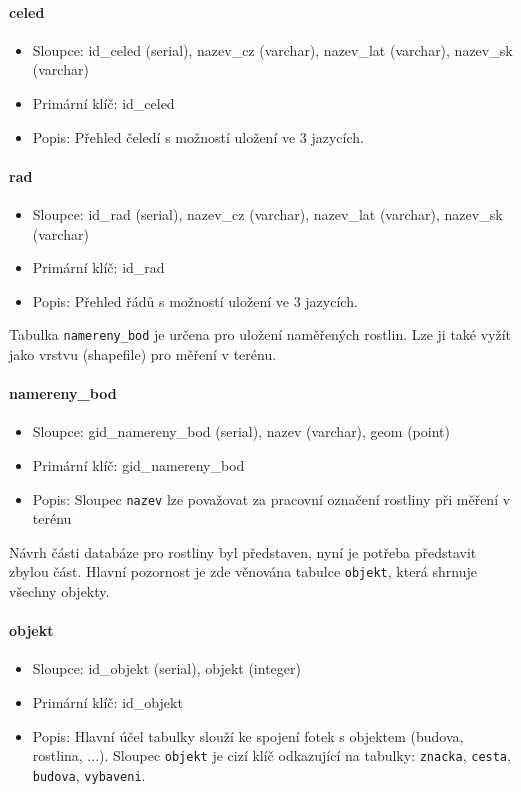 \documentclass[12pt]{article}%
\begin{document}
{{\newpage
\paragraph{celed}
\begin{itemize}
\item Sloupce: id\_celed (serial), nazev\_cz (varchar), nazev\_lat (varchar), nazev\_sk (varchar)
\item Primární klíč: id\_celed
\item Popis: Přehled čeledí s možností uložení ve 3 jazycích.
\end{itemize}

\paragraph{rad}
\begin{itemize}
\item Sloupce: id\_rad (serial), nazev\_cz (varchar), nazev\_lat (varchar), nazev\_sk (varchar) 
\item Primární klíč: id\_rad
\item Popis: Přehled řádů s možností uložení ve 3 jazycích.
\end{itemize}

\newpage
Tabulka \texttt{namereny\_bod} je určena pro uložení naměřených rostlin. Lze ji také vyžít jako vrstvu 
(shapefile) pro měření v terénu.
\paragraph{namereny\_bod}
\begin{itemize}
\item Sloupce: gid\_namereny\_bod (serial), nazev (varchar), geom (point)
\item Primární klíč: gid\_namereny\_bod
\item Popis: Sloupec \texttt{nazev} lze považovat za pracovní označení rostliny při měření v terénu
\end{itemize}

Návrh části databáze pro rostliny byl představen, nyní je potřeba představit zbylou část. Hlavní pozornost
je zde věnována tabulce \texttt{objekt}, která shrnuje všechny objekty. 
\paragraph{objekt}
\begin{itemize}
\item Sloupce: id\_objekt (serial), objekt (integer)
\item Primární klíč: id\_objekt
\item Popis: Hlavní účel tabulky slouží ke spojení fotek s objektem (budova, rostlina, ...). 
Sloupec \texttt{objekt} je cizí klíč odkazující na tabulky: \texttt{znacka}, \texttt{cesta}, 
\texttt{budova}, \texttt{vybaveni}. 
\end{itemize}

}}
\end{document}
